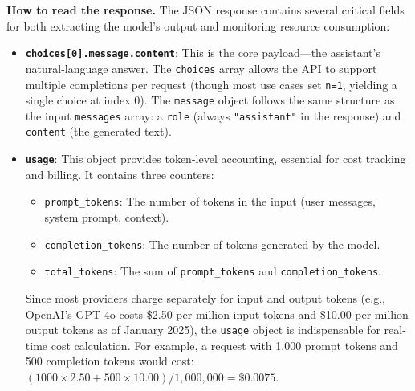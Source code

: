 \documentclass[english]{article}
\begin{document}
\noindent\textbf{How to read the response.}
The JSON response contains several critical fields for both extracting the model's output and monitoring resource consumption:

\begin{itemize}
    \item \textbf{\texttt{choices[0].message.content}}: This is the core payload—the assistant's natural-language answer. The \texttt{choices} array allows the API to support multiple completions per request (though most use cases set \texttt{n=1}, yielding a single choice at index 0). The \texttt{message} object follows the same structure as the input \texttt{messages} array: a \texttt{role} (always \texttt{"assistant"} in the response) and \texttt{content} (the generated text).

    \item \textbf{\texttt{usage}}: This object provides token-level accounting, essential for cost tracking and billing. It contains three counters:
    \begin{itemize}
        \item \texttt{prompt\_tokens}: The number of tokens in the input (user messages, system prompt, context).
        \item \texttt{completion\_tokens}: The number of tokens generated by the model.
        \item \texttt{total\_tokens}: The sum of \texttt{prompt\_tokens} and \texttt{completion\_tokens}.
    \end{itemize}
    Since most providers charge separately for input and output tokens (e.g., OpenAI's GPT-4o costs \$2.50 per million input tokens and \$10.00 per million output tokens as of January 2025), the \texttt{usage} object is indispensable for real-time cost calculation. For example, a request with 1,000 prompt tokens and 500 completion tokens would cost: $(1000 \times 2.50 + 500 \times 10.00) / 1{,}000{,}000 = \$0.0075$.


\end{itemize}
\end{document}
